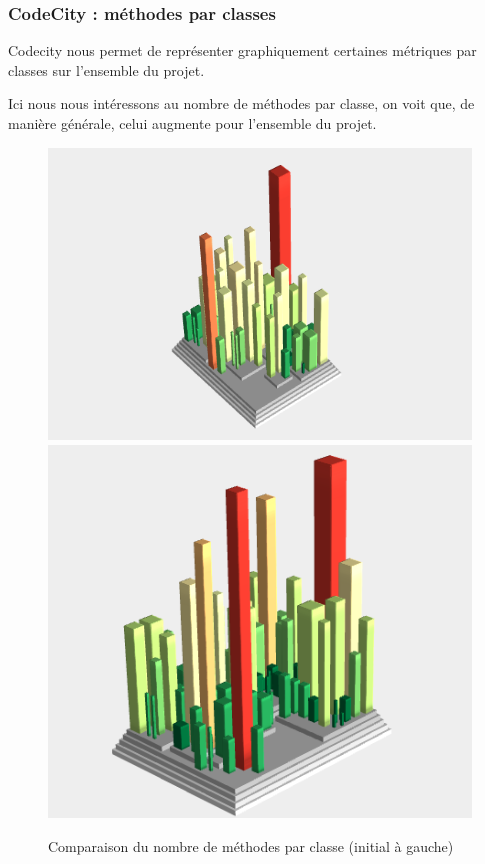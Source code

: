 \documentclass[a4paper,12pt]{report} %
\begin{document}
\subsubsection{CodeCity : méthodes par classes}

Codecity nous permet de représenter graphiquement certaines métriques
par classes sur l'ensemble du projet.

Ici nous nous intéressons au nombre de méthodes par classe, on voit
que, de manière générale, celui augmente pour l'ensemble du projet.

\begin{figure}[!h]
\includegraphics[scale=0.5]{ressources/final_initial_declared_methods}\includegraphics[scale=0.5]{ressources/final_new_declared_methods}\caption{Comparaison du nombre de méthodes par classe (initial à gauche)}


\end{figure}
\end{document}
